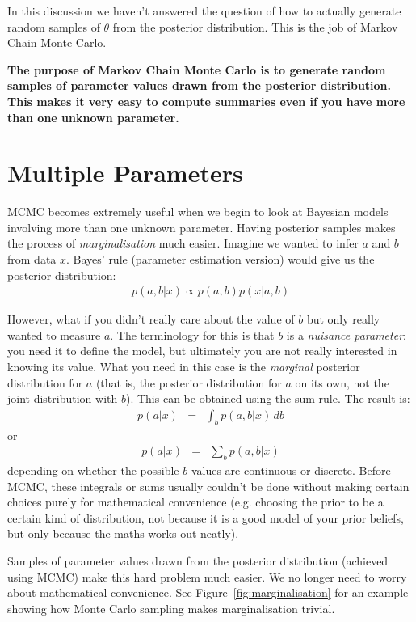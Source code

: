 In this discussion we haven't answered the question of how to actually generate
random samples of $\theta$ from the posterior distribution. This is the job
of Markov Chain Monte Carlo.

\begin{framed}
{\bf
The purpose of Markov Chain Monte Carlo is to generate random samples of
parameter values drawn from the posterior distribution. This makes it very easy
to compute summaries even if you have more than one unknown parameter.}
\end{framed}

\section{Multiple Parameters}
MCMC becomes extremely useful when we begin to look at Bayesian models involving
more than one unknown parameter. 
Having posterior samples makes the process of {\it marginalisation}
much easier. Imagine we wanted to infer $a$ and $b$ from
data $x$. Bayes' rule (parameter estimation version) would give us the posterior
distribution:
\begin{eqnarray}
p(a, b | x) \propto p(a, b)p(x|a,b)
\end{eqnarray}

However, what if you didn't really care about the value of $b$ but
only really wanted to measure $a$. The terminology for this is that $b$ is a
{\it nuisance parameter}: you need it to define the model, but ultimately you
are not really interested in knowing its value.
What you need in this case is the
{\it marginal} posterior distribution for $a$ (that is, the posterior
distribution for $a$ on its own, not the joint distribution with $b$).
This can be obtained using the sum rule. The result is:
\begin{eqnarray}
p(a | x) &=& \int_b p(a, b|x) \, db
\end{eqnarray}
or
\begin{eqnarray}
p(a | x) &=& \sum_{b} p(a, b|x)
\end{eqnarray}
depending on whether the possible $b$ values are continuous or discrete.
Before MCMC, these integrals or sums usually couldn't be done without making
certain choices purely for mathematical convenience (e.g. choosing the prior
to be a certain kind of distribution, not because it is a good model of your
prior beliefs, but only because the maths works out neatly).

Samples of parameter values drawn from the posterior distribution
(achieved using MCMC) make this hard problem much easier. We no longer need
to worry about mathematical convenience.
See Figure~\ref{fig:marginalisation} for an example showing how Monte Carlo
sampling makes marginalisation trivial.

